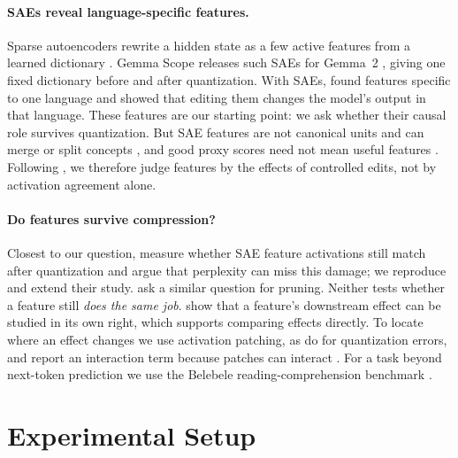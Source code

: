 \documentclass[11pt]{article}
\begin{document}
\paragraph{SAEs reveal language-specific features.}
Sparse autoencoders rewrite a hidden state as a few active features from a learned dictionary \citep{gao2024,rajamanoharan2024}. Gemma Scope releases such SAEs for Gemma~2 \citep{lieberum-etal-2024-gemma}, giving one fixed dictionary before and after quantization. With SAEs, \citet{deng-etal-2025-unveiling} found features specific to one language and showed that editing them changes the model's output in that language. These features are our starting point: we ask whether their causal role survives quantization. But SAE features are not canonical units and can merge or split concepts \citep{leask2025canonical}, and good proxy scores need not mean useful features \citep{karvonen2025saebench}. Following \citet{makelov2025principled}, we therefore judge features by the effects of controlled edits, not by activation agreement alone.

\paragraph{Do features survive compression?}
Closest to our question, \citet{duan2026} measure whether SAE feature activations still match after quantization and argue that perplexity can miss this damage; we reproduce and extend their study. \citet{borobia2026} ask a similar question for pruning. Neither tests whether a feature still \emph{does the same job}. \citet{hoang2026} show that a feature's downstream effect can be studied in its own right, which supports comparing effects directly. To locate where an effect changes we use activation patching, as \citet{chang-etal-2025-inputs} do for quantization errors, and report an interaction term because patches can interact \citep{vaidyanathan2026}. For a task beyond next-token prediction we use the Belebele reading-comprehension benchmark \citep{bandarkar-etal-2024-belebele}.

\section{Experimental Setup}
\end{document}

